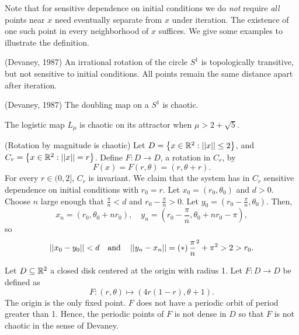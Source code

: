 \documentclass[12pt,draft,twoside]{article}
\begin{document}
\noindent Note that for sensitive dependence on initial conditions we do \textit{not} require \textit{all} points near $x$ need eventually separate from $x$ under iteration.
The existence of one such point in every neighborhood of $x$ suffices.
We give some examples to illustrate the definition.
\begin{example}
  (Devaney, 1987)
  An irrational rotation of the circle $S^1$ is topologically transitive, but not sensitive to initial conditions.
  All points remain the same distance apart after iteration.
\end{example}
\begin{example}
  (Devaney, 1987)
  The doubling map on a $S^1$ is chaotic.
\end{example}
\begin{example}
  The logistic map $L_\mu$ is chaotic on its attractor when $\mu > 2 + \sqrt{5}$.
\end{example}
\begin{example}
  (Rotation by magnitude is chaotic)
  Let $D = \left \{ x \in \mathbb{R}^2: \left|\left| x \right|\right| \leq 2 \right \}$, and $C_r = \left \{ x \in \mathbb{R}^2: \left|\left| x \right|\right| = r \right \}$.
  Define $F: D \to D$, a rotation in $C_r$, by
  \begin{equation*}
    F(x) = F(r, \theta) = (r, \theta + r).
  \end{equation*}
  For every $r \in (0,2]$, $C_r$ is invariant.
  We claim that the system has in $C_r$ sensitive dependence on initial conditions with $r_0 = r$.
  Let $x_0 = (r_0, \theta_0)$ and $d > 0$.
  Choose $n$ large enough that $\frac{\pi}{n} < d$ and $r_0 - \frac{\pi}{n} > 0$.
  Let $y_0 = (r_0 - \frac{\pi}{n}, \theta_0)$.
  Then,
  \begin{equation*}
    x_n = (r_0, \theta_0 + nr_0),\quad
    y_n = (r_0 - \frac{\pi}{n}, \theta_0 + nr_0 - \pi),
  \end{equation*}
  so
  \begin{equation*}
    \left|\left| x_0 - y_0 \right|\right| < d \quad\mbox{and}\quad \left|\left| y_n - x_n \right|\right| = \left ( * \right ){\frac{\pi}{n}}^2 + \pi^2 > 2 > r_0.
  \end{equation*}
\end{example}

\begin{example}
  Let $D \subseteq \mathbb{R}^2$ a closed disk centered at the origin with radius 1.
  Let $F: D \to D$ be defined as
  \begin{equation*}
    F: (r, \theta) \mapsto (4r(1 - r), \theta + 1).
  \end{equation*}
  The origin is the only fixed point.
  $F$ does not have a periodic orbit of period greater than 1.
  Hence, the periodic points of $F$ is not dense in $D$ so that $F$ is not chaotic in the sense of Devaney.
\end{example}
\end{document}
